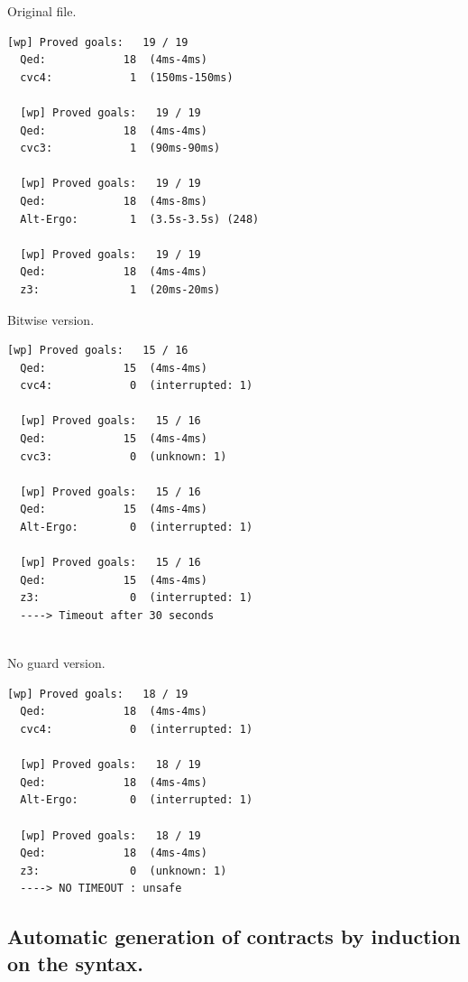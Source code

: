 \documentclass[a4paper,11pt,final]{article}
\begin{document}
  \begin{minipage}{\textwidth}
  \begin{multicols}{3}
  Original file.
  \begin{lstlisting}[basicstyle=\tiny]
  [wp] Proved goals:   19 / 19
  Qed:            18  (4ms-4ms)
  cvc4:            1  (150ms-150ms)
  
  [wp] Proved goals:   19 / 19
  Qed:            18  (4ms-4ms)
  cvc3:            1  (90ms-90ms)
  
  [wp] Proved goals:   19 / 19
  Qed:            18  (4ms-8ms)
  Alt-Ergo:        1  (3.5s-3.5s) (248)
  
  [wp] Proved goals:   19 / 19
  Qed:            18  (4ms-4ms)
  z3:              1  (20ms-20ms)
  \end{lstlisting}
  \columnbreak
  Bitwise version.
  \begin{lstlisting}[basicstyle=\tiny]
  [wp] Proved goals:   15 / 16
  Qed:            15  (4ms-4ms)
  cvc4:            0  (interrupted: 1)
  
  [wp] Proved goals:   15 / 16
  Qed:            15  (4ms-4ms)
  cvc3:            0  (unknown: 1)
  
  [wp] Proved goals:   15 / 16
  Qed:            15  (4ms-4ms)
  Alt-Ergo:        0  (interrupted: 1)
  
  [wp] Proved goals:   15 / 16
  Qed:            15  (4ms-4ms)
  z3:              0  (interrupted: 1)    
  ----> Timeout after 30 seconds
  
  \end{lstlisting}
  \columnbreak
  No guard version.
  \begin{lstlisting}[basicstyle=\tiny]
  [wp] Proved goals:   18 / 19
  Qed:            18  (4ms-4ms)
  cvc4:            0  (interrupted: 1)
  
  [wp] Proved goals:   18 / 19
  Qed:            18  (4ms-4ms)
  Alt-Ergo:        0  (interrupted: 1)
  
  [wp] Proved goals:   18 / 19
  Qed:            18  (4ms-4ms)
  z3:              0  (unknown: 1)   
  ----> NO TIMEOUT : unsafe
  \end{lstlisting}
  \end{multicols}
  \end{minipage}
  
  \subsection{Automatic generation of contracts by induction on the syntax.}
  
\end{document}
